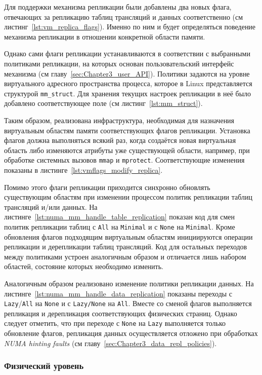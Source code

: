 Для поддержки механизма репликации были добавлены два новых флага, отвечающих за репликацию таблиц трансляций и данных соответственно (см листинг~\ref{lst:vm_replica_flags}). Именно по ним и будет определяться поведение механизма репликации в отношении конкретной области памяти.

Однако сами флаги репликации устанавливаются в соответствии с выбранными политиками репликации, на которых основан пользовательский интерфейс механизма (см главу~\ref{sec:Chapter3_user_API}). Политики задаются на уровне виртуального адресного пространства процесса, которое в Linux представляется структурой \texttt{mm\_struct}. Для хранения текущих настроек репликации в неё было добавлено соответствующее поле (см листинг~\ref{lst:mm_struct}).

Таким образом, реализована инфраструктура, необходимая для назначения виртуальным областям памяти соответствующих флагов репликации. Установка флагов должна выполняться всякий раз, когда создаётся новая виртуальная область либо изменяются атрибуты уже существующей области, например, при обработке системных вызовов \texttt{mmap} и \texttt{mprotect}. Соответствующие изменения показаны в листинге~\ref{lst:vmflags_modify_replica}.

Помимо этого флаги репликации приходится синхронно обновлять существующим областям при изменении процессом политик репликации таблиц трансляций и/или данных. На листинге~\ref{lst:numa_mm_handle_table_replication} показан код для смен политик репликации таблиц с \texttt{All} на \texttt{Minimal} и с \texttt{None} на \texttt{Minimal}. Кроме обновления флагов подходящим виртуальным областям инициируются операции репликации и дерепликации таблиц трансляций. Код для остальных переходов между политиками устроен аналогичным образом и отличается лишь набором областей, состояние которых необходимо изменить.

Аналогичным образом реализовано изменение политики репликации данных. На листинге~\ref{lst:numa_mm_handle_data_replication} показаны переходы с \texttt{Lazy}/\texttt{All} на \texttt{None} и с \texttt{Lazy/None} на \texttt{All}. Вместе со сменой флагов выполняется репликация и дерепликация соответствующих физических страниц. Однако следует отметить, что при переходе с \texttt{None} на \texttt{Lazy} выполняется только обновление флагов, репликация данных осуществляется отложено при обработках \textit{NUMA hinting faults} (см главу~\ref{sec:Chapter3_data_repl_policies}).

\subsubsection{Физический уровень}
\label{sec:Chapter4_phys_layer}

